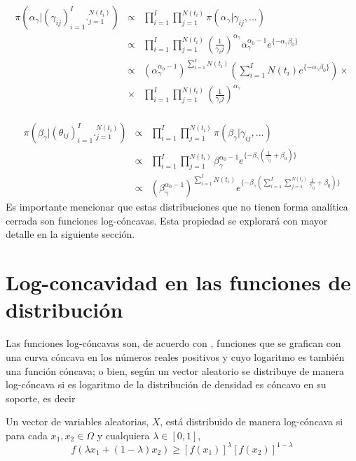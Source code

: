 \begin{eqnarray*}
\pi(\alpha_\gamma|(\gamma_{ij})_{i=1}^I ._{j=1}^{N(t_i)})&\propto & \prod_{i=1}^I \prod_{j=1}^{N(t_i)} \pi(\alpha_\gamma|\gamma_{ij},...)\\
&\propto & \prod_{i=1}^I \prod_{j=1}^{N(t_i)} (\frac{1}{\gamma_ij})^{\alpha_\gamma} \alpha_\gamma^{\alpha_0-1}e^{\{-\alpha_\gamma\beta_0\}}\\
&\propto & (\alpha_\gamma^{\alpha_0-1})^{\sum_{i=1}^I N(t_i)} (\sum_{i=1}^I N(t_i) e^{\{-\alpha_\gamma \beta_0\}}) \times \\
&\times & \prod_{i=1}^I \prod_{j=1}^{N(t_i)}(\frac{1}{\gamma_ij})^{\alpha_\gamma}
\end{eqnarray*}
\\
\begin{eqnarray*}
\pi(\beta_\gamma|(\theta_{ij})_{i=1}^I ._{j=1}^{N(t_i)})&\propto & \prod_{i=1}^I \prod_{j=1}^{N(t_i)} \pi(\beta_\gamma|\gamma_{ij},...)\\
&\propto & \prod_{i=1}^I \prod_{j=1}^{N(t_i)} \beta_\gamma^{\alpha_0-1}e^{\{-\beta_\gamma(\frac{1}{\gamma_{ij}}+\beta_0)\}}\\
&\propto & (\beta_\gamma^{\alpha_0-1})^{\sum_{i=1}^I N(t_i)} e^{\{-\beta_\gamma(\sum_{i=1}^I \sum_{j=1}^{N(t_i)}\frac{1}{\gamma_{ij}}+\beta_0)\}}
\end{eqnarray*}
Es importante mencionar que estas distribuciones que no tienen forma anal\'itica cerrada son funciones log-c\'oncavas. Esta propiedad se explorar\'a con mayor detalle en la siguiente secci\'on.
\section{Log-concavidad en las funciones de distribuci\'on}
Las funciones log-c\'oncavas son, de acuerdo con \cite{bagnoli2005log}, funciones que se grafican con una curva c\'oncava en los n\'umeros reales positivos y cuyo logaritmo es tambi\'en una funci\'on c\'oncava; o bien, seg\'un \cite{an1996log} un vector aleatorio se distribuye de manera log-c\'oncava  si es logaritmo de la distribuci\'on de densidad es c\'oncavo en su soporte, es decir
\begin{defi}
Un vector de variables aleatorias, $X$, est\'a distribuido de manera log-c\'oncava si para cada $x_1, x_2 \in \Omega$ y cualquiera $\lambda \in [0,1]$,
\[f(\lambda x_1+(1-\lambda)x_2) \geq [f(x_1)]^\lambda [f(x_2)]^{1-\lambda}\] 
\end{defi}

